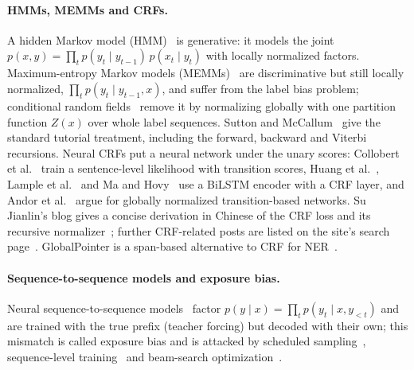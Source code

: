 \documentclass[11pt,a4paper]{article}
\begin{document}
\paragraph{HMMs, MEMMs and CRFs.}
A hidden Markov model (HMM)~\cite{rabiner1989hmm} is generative: it models the joint $p(x,y)=\prod_tp(y_t\mid y_{t-1})\,p(x_t\mid y_t)$ with locally normalized factors.
Maximum-entropy Markov models (MEMMs)~\cite{mccallum2000memm} are discriminative but still locally normalized, $\prod_tp(y_t\mid y_{t-1},x)$, and suffer from the label bias problem; conditional random fields~\cite{lafferty2001crf} remove it by normalizing globally with one partition function $Z(x)$ over whole label sequences.
Sutton and McCallum~\cite{sutton2012crf} give the standard tutorial treatment, including the forward, backward and Viterbi recursions.
Neural CRFs put a neural network under the unary scores: Collobert et al.~\cite{collobert2011nlp} train a sentence-level likelihood with transition scores, Huang et al.~\cite{huang2015bilstmcrf}, Lample et al.~\cite{lample2016ner} and Ma and Hovy~\cite{ma2016bilstmcnnscrf} use a BiLSTM encoder with a CRF layer, and Andor et al.~\cite{andor2016global} argue for globally normalized transition-based networks.
Su Jianlin's blog gives a concise derivation in Chinese of the CRF loss and its recursive normalizer~\cite{su2017crf}; further CRF-related posts are listed on the site's search page~\cite{su2018search}. GlobalPointer is a span-based alternative to CRF for NER~\cite{su2022globalpointer}.

\paragraph{Sequence-to-sequence models and exposure bias.}
Neural sequence-to-sequence models~\cite{sutskever2014seq2seq,bahdanau2015nmt,vaswani2017attention} factor $p(y\mid x)=\prod_tp(y_t\mid x,y_{<t})$ and are trained with the true prefix (teacher forcing) but decoded with their own; this mismatch is called exposure bias and is attacked by scheduled sampling~\cite{bengio2015scheduled}, sequence-level training~\cite{ranzato2016mixer} and beam-search optimization~\cite{wiseman2016bso}.
\end{document}
